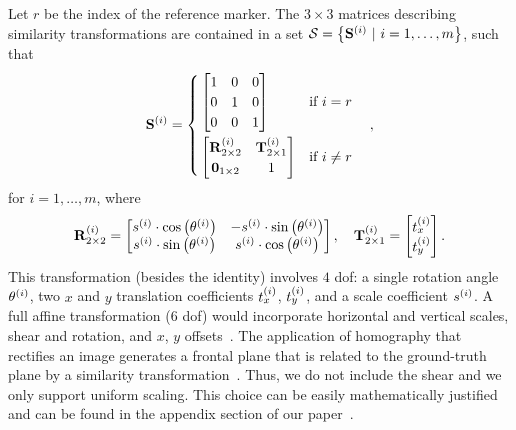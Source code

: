 Let $r$ be the index of the reference marker. The $3 \times 3$ matrices describing similarity transformations are contained in a set $\mathcal{S} = \left\{ {{\mathbf{S}}^{\left( {i} \right)} \ |\ i = 1, \dots, m} \right\}$, such that
\begin{equation}
    \label{eq:SimilarityMatrices}
    {\mathbf{S}}^{\left( {i} \right)} =
    \begin{cases}
        \begin{aligned}
             & \begin{bmatrix}
                1 & 0 & 0 \\
                0 & 1 & 0 \\
                0 & 0 & 1
            \end{bmatrix} & \text{if } i = r   \\
             & \begin{bmatrix}
                {\mathbf{R}}_{2 \times 2}^{\left( {i} \right)} & {\mathbf{T}}_{2 \times 1}^{\left( {i} \right)} \\
                \mathbf{0}_{1 \times 2}                  & 1
            \end{bmatrix} & \text{if }i \neq r \\
        \end{aligned}
    \end{cases},
\end{equation}
for $i = 1, \dots, m$, where
\begin{equation}
    {\mathbf{R}}_{2 \times 2}^{\left( {i} \right)} =
    \begin{bmatrix}
        {s}^{\left( {i} \right)} \cdot {\cos} \left( {\theta}^{\left( {i} \right)} \right) & -{s}^{\left( {i} \right)} \cdot {\sin} \left( {\theta}^{\left( {i} \right)} \right) \\
        {s}^{\left( {i} \right)} \cdot {\sin} \left( {\theta}^{\left( {i} \right)} \right) & {s}^{\left( {i} \right)} \cdot {\cos} \left( {\theta}^{\left( {i} \right)} \right)
    \end{bmatrix}, \quad
    {\mathbf{T}}_{2 \times 1}^{\left( {i} \right)} =
    \begin{bmatrix}
        {t}_{x}^{\left( {i} \right)} \\
        {t}_{y}^{\left( {i} \right)}
    \end{bmatrix}.
\end{equation}
This transformation (besides the identity) involves $4$ \gls{dof}: a single rotation angle ${\theta}^{\left( {i} \right)}$, two $x$ and $y$ translation coefficients ${t}_{x}^{\left( {i} \right)}$, ${t}_{y}^{\left( {i} \right)}$, and a scale coefficient ${s}^{\left( {i} \right)}$. A full affine transformation ($6$ \gls{dof}) would incorporate horizontal and vertical
scales, shear and rotation, and $x$, $y$ offsets~\cite{barath2016novel}. The application of homography that rectifies an image generates a frontal plane that is related to the ground-truth plane by a similarity transformation~\cite{hartley2003multiple, beck2016planar}. Thus, we do not include the shear and we only support uniform scaling. This choice can be easily mathematically justified and can be found in the appendix section of our paper~\cite{ondrasovic2021homography}.

